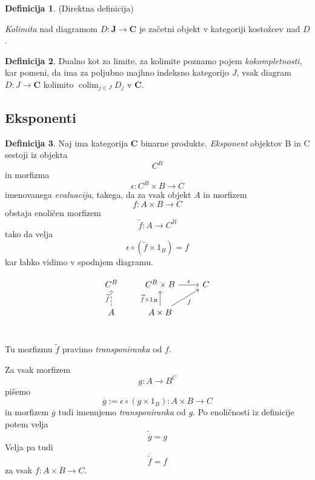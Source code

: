 \documentclass[12pt,a4paper]{book}
\theoremstyle{definition}
\newtheorem{definicija}{Definicija}[chapter]
\theoremstyle{plain}
\theoremstyle{definition}
\theoremstyle{remark}
\newcommand{\cat}[1]{\textbf{#1}}
\DeclareMathOperator{\colim}{colim}
\begin{document}
\begin{definicija} (Direktna definicija)

\emph{Kolimita} nad diagramom $D : \cat{J} \to \cat{C}$ je začetni objekt v kategoriji kostožcev nad $D$.
\end{definicija}

\begin{definicija}
Dualno kot za limite, za kolimite poznamo pojem \emph{kokompletnosti}, kar pomeni, da ima za poljubno majhno indeksno kategorijo $J$, vsak diagram $D : J \to \cat{C}$ kolimito $\colim_{j \in J} D_j$ v $\cat{C}$.
\end{definicija}

\subsection{Eksponenti}

\begin{definicija}
Naj ima kategorija $\cat{C}$ binarne produkte. \textit{Eksponent} objektov B in C sestoji iz objekta 
$$C^B$$
in morfizma
$$\epsilon : C^B \times B \to C$$ imenovanega \textit{evaluacija}, takega, da za vsak objekt $A$ in morfizem 
$$f : A \times B \to C$$
obstaja enoličen morfizem 
$$\widetilde{f} : A \to C^B$$
tako da velja
$$\epsilon \circ (\widetilde{f} \times 1_B) = f$$
kar lahko vidimo v spodnjem diagramu.

$$\begin{tikzcd}
C^B &  C^B \times B \ar[r, "\epsilon"] & C \\
A \ar[u, dashed, "\widetilde{f}"] &  A \times B \ar[u, "\widetilde{f} \times 1_B"] \ar[ur, "f"'] & \\
\end{tikzcd}$$

Tu morfizmu $\widetilde{f}$ pravimo \textit{transponiranka} od $f$.

\end{definicija}

Za vsak morfizem $$g : A \to B^C$$ pišemo
$$ \overline{g} := \epsilon \circ (g \times 1_B) : A \times B \to C$$
in morfizem $\overline{g}$ tudi imenujemo \textit{transponiranka} od $g$. Po enoličnosti iz definicije potem velja
$$\widetilde{\overline{g}} = g$$
Velja pa tudi
$$\overline{\widetilde{f}} = f$$
za vsak $f : A \times B \to C$.
\end{document}
